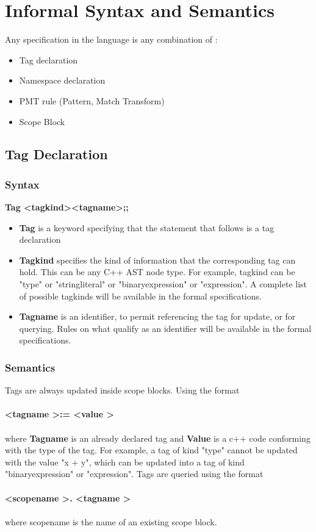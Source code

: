 \documentclass[preprint]{sigplanconf}
\begin{document}
\section{Informal Syntax and Semantics}
Any specification in the language is any combination of :
\begin{itemize}
\item Tag declaration
\item Namespace declaration
\item PMT rule (Pattern, Match Transform)
\item Scope Block
\end{itemize}

\subsection{Tag Declaration}


\subsubsection{Syntax}

\textbf{Tag \textless tagkind\textgreater  \textless tagname\textgreater;;}

\begin{itemize}
\item \textbf{Tag} is a keyword specifying that the statement that follows is a tag 
declaration
\item \textbf{Tagkind} specifies the kind of information that the corresponding tag can hold. This can be any C++ AST node type. For example, tagkind can be "type" or "stringliteral" or "binaryexpression" or "expression". A complete list of possible tagkinds will be available in the formal specifications.
\item \textbf{Tagname} is an identifier, to permit referencing the tag for update, or for querying. Rules on what qualify as an identifier will be available in the formal specifications.

\end{itemize}

\subsubsection{Semantics}


Tags are always updated inside scope blocks. Using the format
\\
\\
\textbf{\textless tagname \textgreater := \textless value \textgreater} 
\\
\\
where \textbf{Tagname} is an already declared tag
and \textbf{Value} is a c++ code conforming with the type of the tag. 
For example,  a tag of kind "type" cannot be updated with the value "x + y", which can be updated into a tag of kind "binaryexpression" or "expression".
Tags are queried using the format 
\\
\\
\textbf{\textless scopename \textgreater . \textless tagname \textgreater}
\\
\\
where scopename is the name of an existing scope block.
\end{document}

